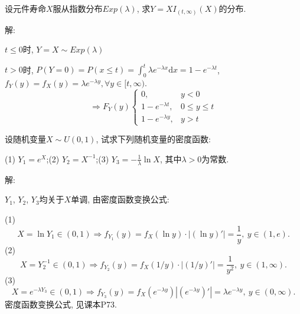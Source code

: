 \documentclass[standard]{ExBook}
\renewenvironment{shaded}{%
  \def\FrameCommand{\fboxsep=\FrameSep \colorbox{shadecolor}}%
  \MakeFramed{\advance\hsize-\width \FrameRestore}%
}{%
  \endMakeFramed
}
\begin{document}
\begin{qitems}
\vspace{2.5cm-5em}

    \begin{bbox}
    \begin{shaded}
        \qitem
设元件寿命$X$服从指数分布$Exp(\lambda)$, 求$Y=XI_{(t,\infty)}(X)$的分布.
    \end{shaded}
    \end{bbox}

\vspace{\dimexpr2.5cm-5em\relax}

解: 

$t\leq0$时, $Y=X\sim Exp(\lambda)$

$t>0$时, $P(Y=0)=P(x\leq t)=\displaystyle\int_{0}^{t}\lambda e^{-\lambda x}\mathrm{d}x=1-e^{-\lambda t}$, $f_{Y}(y)=f_{X}(y)=\lambda e^{-\lambda y},\forall y\in[t,\infty)$.
$$
    \Longrightarrow
    F_{Y}(y)
    \left\{
    \begin{array}{ll}
        0, &y<0\\
        1-e^{-\lambda t}, &0\leq y\leq t\\
        1-e^{-\lambda y}, &y >t
    \end{array}
    \right.
$$

\vspace{2.5cm-5em}

    \begin{bbox}
    \begin{shaded}
        \qitem
设随机变量$X\sim U(0,1)$, 试求下列随机变量的密度函数:

(1) $Y_{1}=e^X$;\qquad(2) $Y_{2}=X^{-1}$;\qquad(3) $Y_{3}=-\frac{1}{\lambda}\ln X$, 其中$\lambda > 0$为常数.
    \end{shaded}
    \end{bbox}

\vspace{\dimexpr2.5cm-5em\relax}

解: 

$Y_1$, $Y_2$, $Y_3$均关于$X$单调, 由密度函数变换公式:

(1) $$X=\ln Y_1\in(0,1) \Longrightarrow f_{Y_1}(y)=f_{X}(\ln y)\cdot|(\ln y)'|=\displaystyle\frac{1}{y},\ y\in(1,e).$$
(2) $$X=Y_{2}^{-1}\in(0,1) \Longrightarrow f_{Y_2}(y)=f_{X}(1/y)\cdot|(1/y)'|=\displaystyle\frac{1}{y^2},\ y\in(1,\infty).$$
(3) $$X=e^{-\lambda Y_3}\in(0,1) \Longrightarrow f_{Y_3}(y)=f_{X}(e^{-\lambda y})|(e^{-\lambda y})'|=\lambda e^{-\lambda y},\ y\in(0,\infty).$$
\textcolor{themeColor}{\selectfont {} 密度函数变换公式, 见课本P73.}


\end{qitems}
\end{document}
